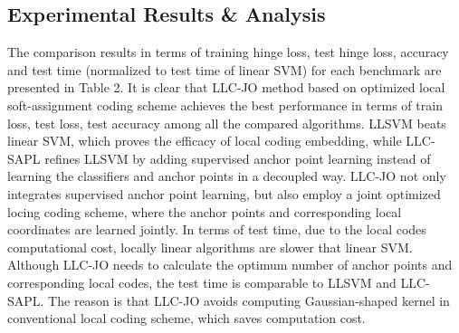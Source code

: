 \documentclass{llncs}
\begin{document}
	\subsection{Experimental Results \& Analysis}
	The comparison results in terms of training hinge loss, test hinge loss, accuracy and test time (normalized to test time of linear SVM) for each benchmark are presented in Table 2.
	It is clear that LLC-JO method based on optimized local soft-assignment coding scheme achieves the best performance in terms of train loss, test loss, test accuracy among all the compared algorithms. LLSVM beats linear SVM, which proves the efficacy of local coding embedding, while LLC-SAPL refines LLSVM by adding supervised anchor point learning instead of learning the classifiers and anchor points in a decoupled way. LLC-JO not only integrates supervised anchor point learning, but also employ a joint optimized locing coding scheme, where the anchor points and corresponding local coordinates are learned jointly. In terms of test time, due to the local codes computational cost, locally linear algorithms are slower that linear SVM. Although LLC-JO needs to calculate the optimum number of anchor points and corresponding local codes, the test time is comparable to LLSVM and LLC-SAPL. The reason is that LLC-JO avoids computing Gaussian-shaped kernel in conventional local coding scheme, which saves computation cost.
	
\end{document}
